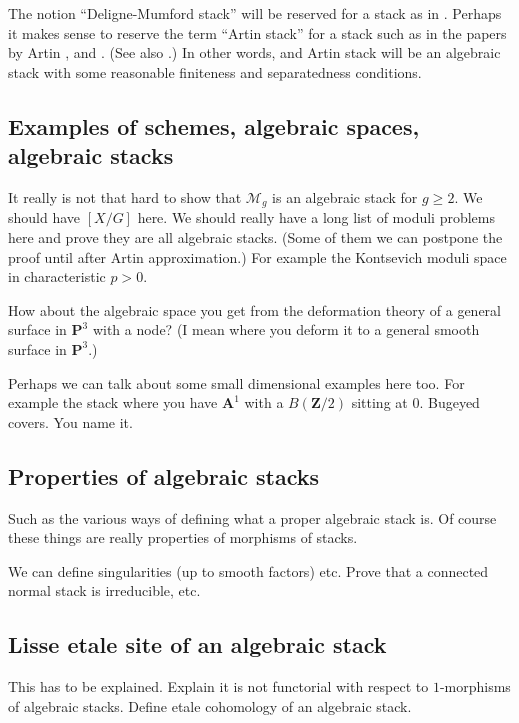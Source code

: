 \documentclass{amsart}
\theoremstyle{definition}
\theoremstyle{remark}
\numberwithin{equation}{subsection}
\begin{document}
\smallskip\noindent
The notion ``Deligne-Mumford stack'' will be reserved for a stack as in 
\cite{DM}. Perhaps it makes sense to reserve the term ``Artin stack'' for
a stack such as in the papers by Artin \cite{Artin}, and \cite{ArtinVersal}.
(See also \cite{ConradeJong}.) In other words, and Artin stack will be an
algebraic stack with some reasonable finiteness and separatedness conditions.

\subsection{Examples of schemes, algebraic spaces, algebraic stacks}
\label{subsection-examples-stacks}

\noindent
It really is not that hard to show that $\mathcal{M}_g$ is an algebraic
stack for $g\geq 2$. We should have $[X/G]$ here. We should really
have a long list of moduli problems here and prove they are all algebraic
stacks. (Some of them we can postpone the proof until after Artin
approximation.) For example the Kontsevich moduli space in characteristic 
$p > 0$.

\smallskip\noindent
How about the algebraic space you get from the deformation theory of
a general surface in $\mathbf{P}^3$ with a node? (I mean where you deform
it to a general smooth surface in $\mathbf{P}^3$.)

\smallskip\noindent
Perhaps we can talk about some small dimensional examples here too. 
For example the stack where you have $\mathbf{A}^1$ with a $B(\mathbf{Z}/2)$ 
sitting at $0$. Bugeyed covers. You name it.

\subsection{Properties of algebraic stacks}
\label{subsection-stacks-properties}

\noindent
Such as the various ways of defining what a proper algebraic stack is.
Of course these things are really properties of morphisms of stacks.

\smallskip\noindent
We can define singularities (up to smooth factors) etc. Prove that a 
connected normal stack is irreducible, etc.

\subsection{Lisse etale site of an algebraic stack}
\label{subsection-lisse-etale}

\noindent
This has to be explained. Explain it is not functorial with respect to
$1$-morphisms of algebraic stacks. Define etale cohomology of an algebraic 
stack.
\end{document}
